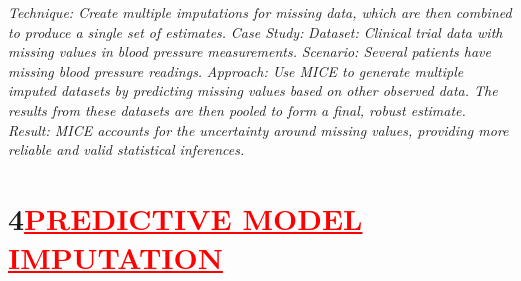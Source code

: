 \documentclass[12pt]{article}
\begin{document}
\hspace{1cm}\large{\emph{Technique: Create multiple imputations for missing data, which are then combined to produce a single set of estimates.}}\vspace{0.25cm}\newline
\hspace{1cm}\large{\emph{Case Study:}}\vspace{0.25cm}\newline
\hspace{1cm}\large{\emph{Dataset: Clinical trial data with missing values in blood pressure measurements.}}\vspace{0.25cm}\newline
\hspace{1cm}\large{\emph{Scenario: Several patients have missing blood pressure readings.}}\vspace{0.25cm}\newline
\hspace{1cm}\large{\emph{Approach: Use MICE to generate multiple imputed datasets by predicting missing values based on other observed data. The results from these datasets are then pooled to form a final, robust estimate.}}\vspace{0.25cm}\newline
\hspace{1cm}\large{\emph{Result: MICE accounts for the uncertainty around missing values, providing more reliable and valid statistical inferences.}}\newpage
\section*{\textbf{\hspace{1cm}4\hspace{1cm}\textcolor{red}{\underline{\large{PREDICTIVE MODEL IMPUTATION}}}}}
\end{document}

